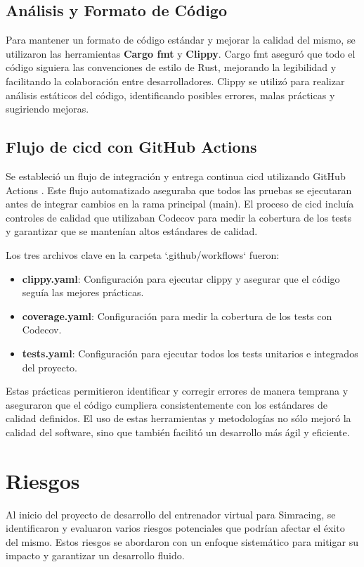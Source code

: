 \subsection{Análisis y Formato de Código}
Para mantener un formato de código estándar y mejorar la calidad del mismo, se utilizaron las herramientas \textbf{Cargo fmt} y \textbf{Clippy}. Cargo fmt aseguró que todo el código siguiera las convenciones de estilo de Rust, mejorando la legibilidad y facilitando la colaboración entre desarrolladores. Clippy se utilizó para realizar análisis estáticos del código, identificando posibles errores, malas prácticas y sugiriendo mejoras.


\subsection{Flujo de \ac{cicd} con GitHub Actions}
Se estableció un flujo de integración y entrega continua \ac{cicd} utilizando GitHub Actions \cite{github_actions}. Este flujo automatizado aseguraba que todos las pruebas se ejecutaran antes de integrar cambios en la rama principal (main). El proceso de \ac{cicd} incluía controles de calidad que utilizaban Codecov \cite{codecov} para medir la cobertura de los tests y garantizar que se mantenían altos estándares de calidad.

Los tres archivos clave en la carpeta `.github/workflows` fueron:
\begin{itemize}
    \item \textbf{clippy.yaml}: Configuración para ejecutar clippy y asegurar que el código seguía las mejores prácticas.
    \item \textbf{coverage.yaml}: Configuración para medir la cobertura de los tests con Codecov.
    \item \textbf{tests.yaml}: Configuración para ejecutar todos los tests unitarios e integrados del proyecto.
\end{itemize}

Estas prácticas permitieron identificar y corregir errores de manera temprana y aseguraron que el código cumpliera consistentemente con los estándares de calidad definidos. El uso de estas herramientas y metodologías no sólo mejoró la calidad del software, sino que también facilitó un desarrollo más ágil y eficiente.

\section{Riesgos}
Al inicio del proyecto de desarrollo del entrenador virtual para Simracing, se identificaron y evaluaron varios riesgos potenciales que podrían afectar el éxito del mismo. Estos riesgos se abordaron con un enfoque sistemático para mitigar su impacto y garantizar un desarrollo fluido.

